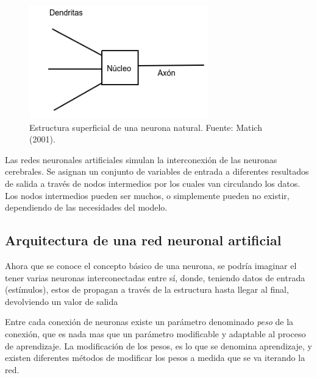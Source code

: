 \documentclass[a4paper,12pt,oneside,spanish]{book}
\begin{document}
\begin{figure}[h!]
	\includegraphics[width=220pt]{Imagenes/neurona.jpg}
	\centering
	\caption{Estructura superficial de una neurona natural. Fuente: Matich (2001).}
	\label{fig:haarlike1}
\end{figure}

Las redes neuronales artificiales simulan la interconexión de las neuronas cerebrales. Se asignan un conjunto de variables de entrada a diferentes resultados de salida a través de nodos intermedios por los cuales van circulando los datos. Los nodos intermedios pueden ser muchos, o simplemente pueden no existir, dependiendo de las necesidades del modelo. \par

\subsection{Arquitectura de una red neuronal artificial}
Ahora que se conoce el concepto básico de una neurona, se podría imaginar el tener varias neuronas interconectadas entre sí, donde, teniendo datos de entrada (estímulos), estos de propagan a través de la estructura hasta llegar al final, devolviendo un valor de salida\par

Entre cada conexión de neuronas existe un parámetro denominado \textit{peso} de la conexión, que es nada mas que un parámetro modificable y adaptable al proceso de aprendizaje. La modificación de los pesos, es lo que se denomina aprendizaje, y existen diferentes métodos de modificar los pesos a medida que se va iterando la red.\par
\end{document}
